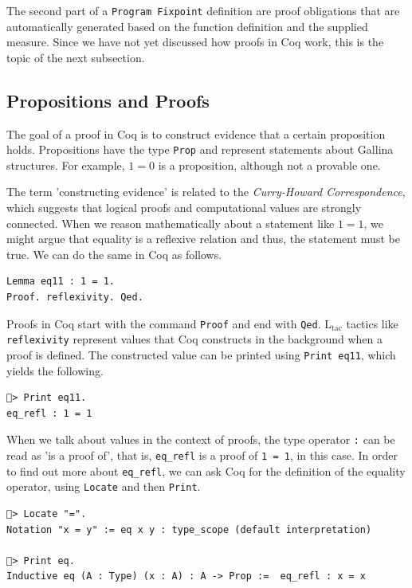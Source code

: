 \documentclass[a4paper, 11pt, fleqn, twoside, abstract=on]{scrreprt}
\newcommand{\cinl}[1]{\texttt{#1}}
\begin{document}
The second part of a \cinl{Program Fixpoint} definition are proof obligations that are automatically generated based on the function definition and the supplied measure.
Since we have not yet discussed how proofs in Coq work, this is the topic of the next subsection.

\subsection{Propositions and Proofs}

The goal of a proof in Coq is to construct evidence that a certain proposition holds.
Propositions have the type \cinl{Prop} and represent statements about Gallina structures.
For example, $1 = 0$ is a proposition, although not a provable one.

The term 'constructing evidence' is related to the \textit{Curry-Howard Correspondence}, which suggests that logical proofs and computational values are strongly connected.
When we reason mathematically about a statement like $1 = 1$, we might argue that equality is a reflexive relation and thus, the statement must be true.
We can do the same in Coq as follows.

\begin{verbatim}
Lemma eq11 : 1 = 1.
Proof. reflexivity. Qed.
\end{verbatim}

Proofs in Coq start with the command \cinl{Proof} and end with \cinl{Qed}.
L$_\text{tac}$ tactics like \cinl{reflexivity} represent values that Coq constructs in the background when a proof is defined.
The constructed value can be printed using \cinl{Print eq11}, which yields the following.

\begin{verbatim}
🐔> Print eq11.
eq_refl : 1 = 1
\end{verbatim}

When we talk about values in the context of proofs, the type operator \cinl{:} can be read as 'is a proof of', that is, \cinl{eq_refl} is a proof of \cinl{1 = 1}, in this case.
In order to find out more about \cinl{eq_refl}, we can ask Coq for the definition of the equality operator, using \cinl{Locate} and then \cinl{Print}.

\begin{verbatim}
🐔> Locate "=".
Notation "x = y" := eq x y : type_scope (default interpretation)

🐔> Print eq.
Inductive eq (A : Type) (x : A) : A -> Prop :=  eq_refl : x = x
\end{verbatim}
\end{document}
